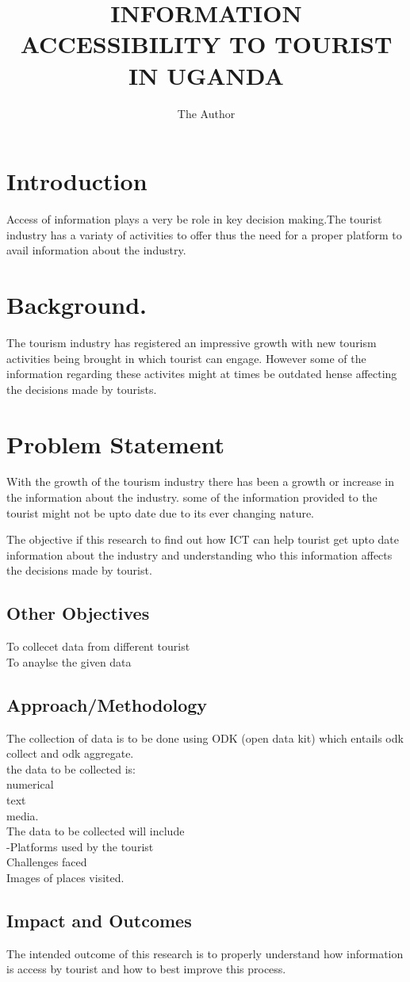 \documentclass[11pt]{article} %
\title{INFORMATION ACCESSIBILITY TO TOURIST IN UGANDA}
\author{The Author}
\begin{document}
\maketitle

\section{Introduction}
Access of information plays a very be role in key decision making.The tourist industry has a variaty of activities to offer thus the need for a proper platform to avail information about the industry. 


\section{Background.}
The tourism industry has registered an impressive growth with new tourism activities being brought in which tourist can engage. 
However some of the information regarding these activites might at times be outdated hense affecting the decisions made by tourists.  

\section{Problem Statement}
With the growth of the tourism industry there has been a growth or increase in the information about the industry. some of the information provided to the tourist might not be upto date due to its ever changing nature.  

 The objective if this research to find out how ICT can help tourist get upto date information about the industry and understanding who this information affects the decisions made by tourist. 
 \subsection{Other Objectives }
 To collecet data from different tourist\\ 
 To anaylse the given data
\subsection{Approach/Methodology} 
The collection of data is to be done using ODK (open data kit) which entails odk collect and odk aggregate.\\
the data to be collected is:\\ numerical\\ text\\media.\\ 
The data to be collected will include \\-Platforms used by the tourist\\ Challenges faced\\ Images of places visited.


\subsection{Impact and Outcomes}
The intended outcome of this research is to properly understand how information is access by tourist and how to best improve this process.
\end{document}
